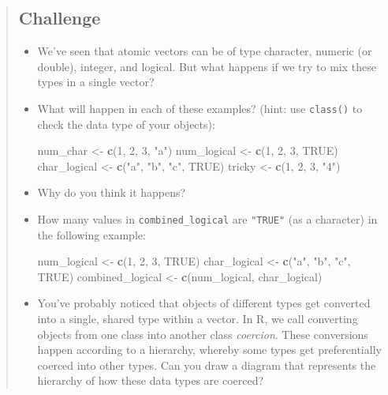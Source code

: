 \documentclass[]{book}
\newenvironment{Shaded}{\begin{snugshade}}{\end{snugshade}}
\newcommand{\KeywordTok}[1]{\textcolor[rgb]{0.13,0.29,0.53}{\textbf{#1}}}
\newcommand{\DecValTok}[1]{\textcolor[rgb]{0.00,0.00,0.81}{#1}}
\newcommand{\StringTok}[1]{\textcolor[rgb]{0.31,0.60,0.02}{#1}}
\newcommand{\OtherTok}[1]{\textcolor[rgb]{0.56,0.35,0.01}{#1}}
\newcommand{\NormalTok}[1]{#1}
\begin{document}
\begin{quote}
\subsection{Challenge}\label{challenge-1}

\begin{itemize}
\item
  We've seen that atomic vectors can be of type character, numeric (or
  double), integer, and logical. But what happens if we try to mix these
  types in a single vector?
\item
  What will happen in each of these examples? (hint: use
  \texttt{class()} to check the data type of your objects):

\begin{Shaded}
\begin{Highlighting}[]
\NormalTok{num_char <-}\StringTok{ }\KeywordTok{c}\NormalTok{(}\DecValTok{1}\NormalTok{, }\DecValTok{2}\NormalTok{, }\DecValTok{3}\NormalTok{, }\StringTok{"a"}\NormalTok{)}
\NormalTok{num_logical <-}\StringTok{ }\KeywordTok{c}\NormalTok{(}\DecValTok{1}\NormalTok{, }\DecValTok{2}\NormalTok{, }\DecValTok{3}\NormalTok{, }\OtherTok{TRUE}\NormalTok{)}
\NormalTok{char_logical <-}\StringTok{ }\KeywordTok{c}\NormalTok{(}\StringTok{"a"}\NormalTok{, }\StringTok{"b"}\NormalTok{, }\StringTok{"c"}\NormalTok{, }\OtherTok{TRUE}\NormalTok{)}
\NormalTok{tricky <-}\StringTok{ }\KeywordTok{c}\NormalTok{(}\DecValTok{1}\NormalTok{, }\DecValTok{2}\NormalTok{, }\DecValTok{3}\NormalTok{, }\StringTok{"4"}\NormalTok{)}
\end{Highlighting}
\end{Shaded}
\item
  Why do you think it happens?
\item
  How many values in \texttt{combined\_logical} are \texttt{"TRUE"} (as
  a character) in the following example:

\begin{Shaded}
\begin{Highlighting}[]
\NormalTok{num_logical <-}\StringTok{ }\KeywordTok{c}\NormalTok{(}\DecValTok{1}\NormalTok{, }\DecValTok{2}\NormalTok{, }\DecValTok{3}\NormalTok{, }\OtherTok{TRUE}\NormalTok{)}
\NormalTok{char_logical <-}\StringTok{ }\KeywordTok{c}\NormalTok{(}\StringTok{"a"}\NormalTok{, }\StringTok{"b"}\NormalTok{, }\StringTok{"c"}\NormalTok{, }\OtherTok{TRUE}\NormalTok{)}
\NormalTok{combined_logical <-}\StringTok{ }\KeywordTok{c}\NormalTok{(num_logical, char_logical)}
\end{Highlighting}
\end{Shaded}
\item
  You've probably noticed that objects of different types get converted
  into a single, shared type within a vector. In R, we call converting
  objects from one class into another class \emph{coercion}. These
  conversions happen according to a hierarchy, whereby some types get
  preferentially coerced into other types. Can you draw a diagram that
  represents the hierarchy of how these data types are coerced?
\end{itemize}
\end{quote}
\end{document}
